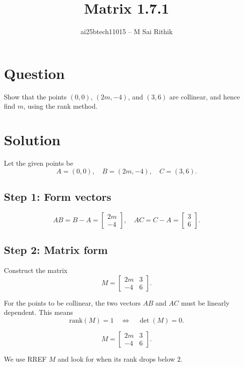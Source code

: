 \documentclass[12pt]{article}
\title{Matrix 1.7.1}
\author{ai25btech11015 -- M Sai Rithik}
\date{}
\begin{document}
\maketitle

\section*{Question}
Show that the points \((0,0)\), \((2m,-4)\), and \((3,6)\) are collinear, and hence find \(m\), using the rank method.

\section*{Solution}

Let the given points be
\[
A = (0,0), \quad B = (2m,-4), \quad C = (3,6).
\]

\subsection*{Step 1: Form vectors}
\[
AB = B - A = \begin{bmatrix} 2m \\ -4 \end{bmatrix}, 
\quad AC = C - A = \begin{bmatrix} 3 \\ 6 \end{bmatrix}.
\]

\subsection*{Step 2: Matrix form}
Construct the matrix
\[
M = \begin{bmatrix}
2m & 3 \\
-4 & 6
\end{bmatrix}.
\]

For the points to be collinear, the two vectors \(AB\) and \(AC\) must be linearly dependent.  
This means
\[
\text{rank}(M) = 1 \quad \Leftrightarrow \quad \det(M) = 0.
\]

\[
M=\begin{bmatrix}
2m & 3\\
-4 & 6
\end{bmatrix}.
\]

We use RREF \(M\) and look for when its rank drops below \(2\).
\end{document}
